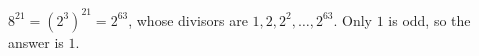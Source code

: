 $8^{21}=(2^3)^{21}=2^{63}$, whose divisors are $1,2,2^2,\dots,2^{63}$. Only $1$ is odd, so the answer is $\boxed{1}$.

